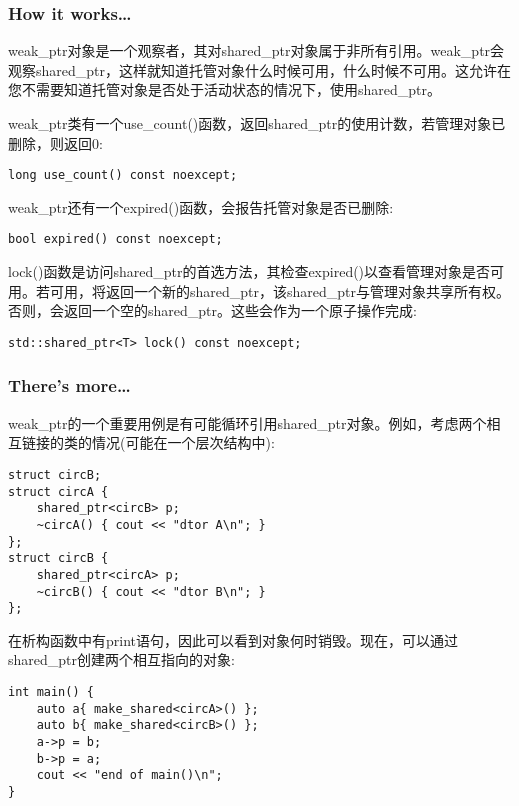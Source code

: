 \subsubsection{How it works…}

weak\_ptr对象是一个观察者，其对shared\_ptr对象属于非所有引用。weak\_ptr会观察shared\_ptr，这样就知道托管对象什么时候可用，什么时候不可用。这允许在您不需要知道托管对象是否处于活动状态的情况下，使用shared\_ptr。

weak\_ptr类有一个use\_count()函数，返回shared\_ptr的使用计数，若管理对象已删除，则返回0:

\begin{lstlisting}[style=styleCXX]
long use_count() const noexcept;
\end{lstlisting}

weak\_ptr还有一个expired()函数，会报告托管对象是否已删除:

\begin{lstlisting}[style=styleCXX]
bool expired() const noexcept;
\end{lstlisting}

lock()函数是访问shared\_ptr的首选方法，其检查expired()以查看管理对象是否可用。若可用，将返回一个新的shared\_ptr，该shared\_ptr与管理对象共享所有权。否则，会返回一个空的shared\_ptr。这些会作为一个原子操作完成:

\begin{lstlisting}[style=styleCXX]
std::shared_ptr<T> lock() const noexcept;
\end{lstlisting}


\subsubsection{There's more…}

weak\_ptr的一个重要用例是有可能循环引用shared\_ptr对象。例如，考虑两个相互链接的类的情况(可能在一个层次结构中):

\begin{lstlisting}[style=styleCXX]
struct circB;
struct circA {
	shared_ptr<circB> p;
	~circA() { cout << "dtor A\n"; }
};
struct circB {
	shared_ptr<circA> p;
	~circB() { cout << "dtor B\n"; }
};
\end{lstlisting}

在析构函数中有print语句，因此可以看到对象何时销毁。现在，可以通过shared\_ptr创建两个相互指向的对象:

\begin{lstlisting}[style=styleCXX]
int main() {
	auto a{ make_shared<circA>() };
	auto b{ make_shared<circB>() };
	a->p = b;
	b->p = a;
	cout << "end of main()\n";
}
\end{lstlisting}

